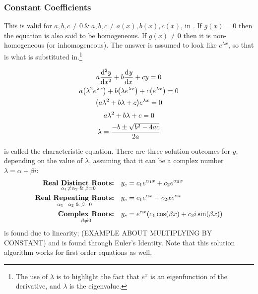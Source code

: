     \subsubsection{Constant Coefficients}
    This is valid for $a,b,c\neq0\ \&\  a,b,c\neq a(x),b(x),c(x)$, in . If $g(x)=0$ then the equation is also said to be homogeneous. If $g(x)\neq0$ then it is non-homogeneous (or inhomogeneous). The answer is assumed to look like $e^{\lambda x}$, so that is what is substituted in.\footnote{The use of $\lambda$ is to highlight the fact that $e^x$ is an eigenfunction of the derivative, and $\lambda$ is the eigenvalue.}
    \begin{multicols}{2}\raggedcolumns
        {\length[0.25cm]
            \begin{gather*}
                a\der[2]{y}{x}+b\der{y}{x}+cy=0
                \\
                a\qty(\lambda^2e^{\lambda x})+b\qty(\lambda e^{\lambda x})+c\qty(e^{\lambda x})=0
                \\
                \qty(a\lambda^2+b\lambda+c)e^{\lambda x}=0
            \end{gather*}
        }   
        {\length[0.25cm]
            \begin{gather}
                a\lambda^2+b\lambda+c=0 \label{eqn:chareqn}
                \\
                \lambda=\frac{-b\pm\sqrt{b^2-4ac}}{2a}\notag
            \end{gather}
        } 
    \end{multicols}
     is called the characteristic equation.
    There are three solution outcomes for $y$, depending on the value of $\lambda$, assuming that it can be a complex number $\lambda=\alpha+\beta i$:
    {\length[0.7cm]
        \begin{align}
            \underset { \alpha_1 \neq \alpha_2\And \beta=0 }{\textbf{Real Distinct Roots:}}&& y_c&=c_1e^{\alpha_1x}+c_2e^{\alpha_2x}\label{eqn:realdistinctroots}
            \\
            \underset{\alpha_1=\alpha_2 \And \beta=0 }{\textbf{Real Repeating Roots:}}&& y_c&=c_1e^{\alpha x}+c_2xe^{\alpha x}\label{eqn:realrepeatroots}
            \\
            \underset{\beta \neq 0}{\textbf{Complex Roots:}}&& y_c&=e^{\alpha x}\qty(c_1\cos(\beta x)+c_2i\sin(\beta x))\label{eqn:complexroots}
        \end{align}
    }
     is found due to linearity; (EXAMPLE ABOUT MULTIPLYING BY CONSTANT) and  is found through Euler's Identity. Note that this solution algorithm works for first order equations as well.  
    \\[0.25cm]
    
